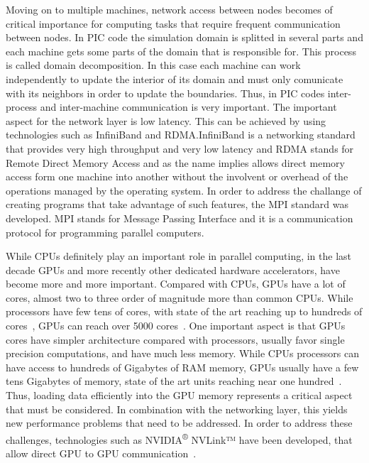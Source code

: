 \documentclass[12pt, class=report, crop=false]{standalone}
\begin{document}
Moving on to multiple machines, network access between nodes becomes of critical
importance for computing tasks that require frequent communication between
nodes. In PIC code the simulation domain is splitted in several parts
and each machine gets some parts of the domain that is responsible for.
This process is called domain decomposition. In this case each machine can
work independently to update the interior of its domain and must only comunicate
with its neighbors in order to update the boundaries. Thus, in PIC codes inter-process
and inter-machine communication is very important. The important aspect for the
network layer is low latency. This can be achieved by using technologies such as
InfiniBand and RDMA.\@ InfiniBand is a networking standard that provides very high
throughput and very low latency and RDMA stands for Remote Direct Memory Access
and as the name implies allows direct memory access form one machine into another
without the involvent or overhead of the operations managed by the operating system.
In order to address the challange of creating programs that take advantage of such
features, the MPI standard was developed. MPI stands for Message Passing Interface
and it is a communication protocol for programming parallel computers.

While CPUs definitely play an important role in parallel computing, in the last
decade GPUs and more recently other dedicated hardware accelerators, have become
more and more important. Compared with CPUs, GPUs have a lot of cores, almost
two to three order of magnitude more than common CPUs. While processors have
few tens of cores, with state of the art reaching up to hundreds of
cores~\autocite{intelcorporation_intelxeon_2016, ibm_power9servers_2018,
vazhkudai_designdeployment_2018},
GPUs can reach over 5000 cores~\autocite{nvidiacorporation_nvidiatesla_2018}.
One important aspect is that GPUs cores have simpler architecture compared with
processors, usually favor single precision computations, and have much less memory.
While CPUs processors can have access to hundreds of Gigabytes of RAM memory,
GPUs usually have a few tens Gigabytes of memory, state of the art units reaching
near one hundred~\autocite{vazhkudai_designdeployment_2018}.\@
Thus, loading data efficiently into the GPU memory represents a critical aspect
that must be considered. In combination with the networking layer,
this yields new performance problems that need to be addressed.
In order to address these challenges, technologies such as
NVIDIA\textsuperscript{®} NVLink™ have been developed, that allow direct
GPU to GPU communication~\autocite{nvidiacorporation_nvidianvlink_2018}.
\end{document}
